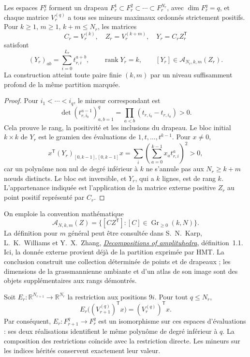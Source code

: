 \begin{theorem}
\label{thm:dim-all-ranks}
Les espaces \(F_r^q\) forment un drapeau \(F_r^1\subset F_r^2\subset\cdots\subset F_r^{N_r}\), avec \(\dim F_r^q=q\), et chaque matrice \(V_r^{(q)}\) a tous ses mineurs maximaux ordonnés strictement positifs. Pour \(k\geq1\), \(m\geq1\), \(k+m\leq N_r\), les matrices
\[
 C_r=V_r^{(k)},\quad Z_r=V_r^{(k+m)},\quad
 Y_r=C_rZ_r^{\mathsf T}
\]
satisfont
\[
 (Y_r)_{ab}=\sum_{i=0}^{L_r}t_{r,i}^{a+b},\qquad
 \operatorname{rank}Y_r=k,\qquad
 [Y_r]\in\mathcal A_{N_r,k,m}(Z_r).
\]
La construction atteint toute paire finie \((k,m)\) par un niveau
suffisamment profond de la même partition marquée.
\end{theorem}
\begin{proof}
Pour \(i_1<\cdots<i_q\), le mineur correspondant est
\[
 \det(t_{r,i_b}^{a-1})_{a,b=1}^{q}
   =\prod_{a<b}(t_{r,i_b}-t_{r,i_a})>0.
\]
Cela prouve le rang, la positivité et les inclusions du drapeau. Le bloc
initial \(k\times k\) de \(Y_r\) est le gramien des évaluations
de \(1,t,\ldots,t^{k-1}\). Pour \(x\neq0\),
\[
 x^{\mathsf T}(Y_r)_{[0,k-1],[0,k-1]}x
 =\sum_i\left(\sum_{a=0}^{k-1}x_at_{r,i}^{a}\right)^2>0,
\]
car un polynôme non nul de degré inférieur à \(k\) ne s’annule pas
aux \(N_r\geq k+m\) nœuds distincts. Le bloc est inversible,
et \(Y_r\), qui a \(k\) lignes, est de rang \(k\).
L’appartenance indiquée est l’application de la matrice externe positive
\(Z_r\) au point positif représenté par \(C_r\).
\end{proof}

On emploie la convention mathématique
\[
 \mathcal A_{N,k,m}(Z)=
 \{[CZ^{\mathsf T}]:[C]\in\operatorname{Gr}_{\geq0}(k,N)\}.
\]
La définition pour \(m\) général peut être consultée dans S.~N.~Karp, L.~K.~Williams et Y.~X.~Zhang,
\href{https://people.math.harvard.edu/~williams/papers/amplituhedron-plus.pdf}
{\emph{Decompositions of amplituhedra}}, définition~1.1.
Ici, la donnée externe provient déjà de la partition exprimée par HMT. La conclusion construit une collection déterminée de points et de drapeaux ; les dimensions de la grassmannienne ambiante et d'un atlas de son image sont des objets supplémentaires aux rangs démontrés.

Soit \(E_r:\mathbb R^{N_{r+1}}\to\mathbb R^{N_r}\) la restriction aux positions \(9i\). Pour tout \(q\leq N_r\),
\[
 E_r\bigl((V_{r+1}^{(q)})^{\mathsf T}x\bigr)
       =(V_r^{(q)})^{\mathsf T}x.
\]
Par conséquent, \(E_r:F_{r+1}^q\to F_r^q\) est un isomorphisme sur ces espaces d'évaluations : ses deux réalisations identifient le même polynôme de degré inférieur à \(q\). La composition des restrictions coïncide avec la restriction directe. Les mineurs sur les indices hérités conservent exactement leur valeur.

